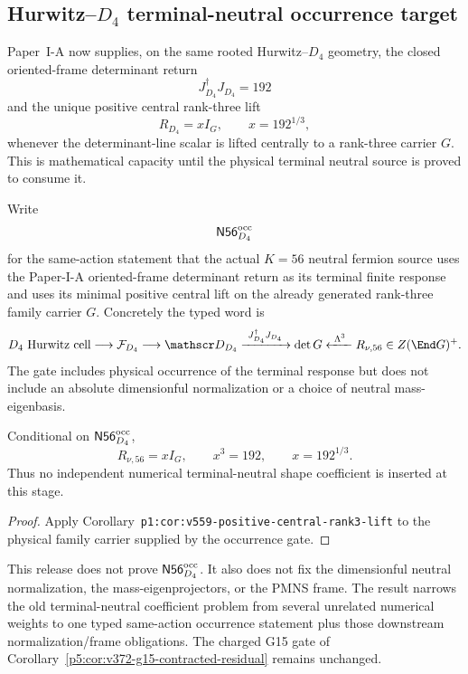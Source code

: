 \documentclass[12pt,a4paper]{article}
\begin{document}
\subsection{Hurwitz--\texorpdfstring{\(D_4\)}{D4} terminal-neutral occurrence target}
\label{p5:sec:v373-d4-terminal-neutral-occurrence}

Paper~I-A now supplies, on the same rooted Hurwitz--\(D_4\) geometry, the
closed oriented-frame determinant return
\[
 J_{D_4}^{\dagger}J_{D_4}=192
\]
and the unique positive central rank-three lift
\[
 R_{D_4}=xI_G,\qquad x=192^{1/3},
\]
whenever the determinant-line scalar is lifted centrally to a rank-three
carrier \(G\).  This is mathematical capacity until the physical terminal
neutral source is proved to consume it.

\begin{definition}
\label{p5:def:v373-n56-d4-occurrence-gate}
Write
\[
 \mathsf{N56}_{D_4}^{\rm occ}
\]
for the same-action statement that the actual \(K=56\) neutral fermion source
uses the Paper-I-A oriented-frame determinant return as its terminal finite
response and uses its minimal positive central lift on the already generated
rank-three family carrier \(G\).  Concretely the typed word is
\[
 D_4\text{ Hurwitz cell}
 \longrightarrow\mathcal F_{D_4}
 \longrightarrow\mathscr D_{D_4}
 \xrightarrow{\ J_{D_4}^{\dagger}J_{D_4}\ }
 \det G
 \xleftarrow{\ \Lambda^3\ }
 R_{\nu,56}\in Z(\End G)^+ .
\]
The gate includes physical occurrence of the terminal response but does not
include an absolute dimensionful normalization or a choice of neutral
mass-eigenbasis.
\end{definition}

\begin{proposition}
\label{p5:prop:v373-n56-d4-central-response}
Conditional on \(\mathsf{N56}_{D_4}^{\rm occ}\),
\[
 \boxed{R_{\nu,56}=xI_G,\qquad x^3=192,\qquad x=192^{1/3}.}
\]
Thus no independent numerical terminal-neutral shape coefficient is inserted
at this stage.
\end{proposition}

\begin{proof}
Apply Corollary~\texttt{p1:cor:v559-positive-central-rank3-lift} to the
physical family carrier supplied by the occurrence gate.
\end{proof}

\begin{remark}
\label{p5:rem:v373-neutral-residual}
This release does not prove \(\mathsf{N56}_{D_4}^{\rm occ}\).  It also does
not fix the dimensionful neutral normalization, the mass-eigenprojectors, or
the PMNS frame.  The result narrows the old terminal-neutral coefficient
problem from several unrelated numerical weights to one typed same-action
occurrence statement plus those downstream normalization/frame obligations.
The charged G15 gate of Corollary~\ref{p5:cor:v372-g15-contracted-residual}
remains unchanged.
\end{remark}
\end{document}
